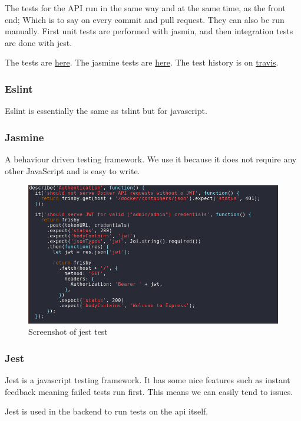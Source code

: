 \documentclass[]{article}
\begin{document}
The tests for the API run in the same way and at the same time, as the front end; Which is to
say on every commit and pull request. They can also be run manually. First unit
tests are performed with jasmin, and then integration tests are done with jest.

The tests are \href{https://github.com/TripleParity/docker-api/tree/master/spec}{here}.
The jasmine tests are \href{https://github.com/TripleParity/docks-api/blob/master/__tests__/api/api_spec.js}{here}.
The test history is on \href{https://travis-ci.org/TripleParity/docker-api}{travis}.

\subsubsection{Eslint}
Eslint is essentially the same as tslint but for javascript.

\subsubsection{Jasmine}
A behaviour driven testing framework. We use it because it 
does not require any other JavaScript and is easy to write.

\begin{figure}[H]
 	\centering
	\includegraphics[scale=0.5]{jest.png}
	\caption{Screenshot of jest test}
\end{figure}


\subsubsection{Jest}
Jest is a javascript testing framework.
It has some nice features such as instant feedback meaning
failed tests run first. This means we can easily tend to issues.

Jest is used in the backend to run tests on the api itself.
\end{document}
